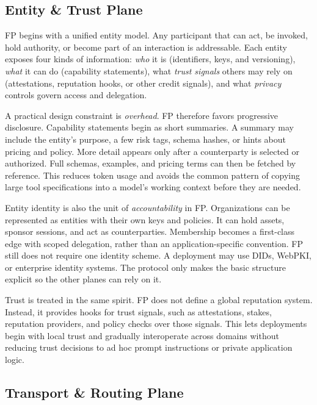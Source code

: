 \documentclass{foundationpaper}
\begin{document}
\subsection{Entity \& Trust Plane}
\label{subsec:entity}

FP begins with a unified entity model. Any participant that can act, be invoked, hold authority, or become part of an interaction is addressable. Each entity exposes four kinds of information: \emph{who} it is (identifiers, keys, and versioning), \emph{what} it can do (capability statements), what \emph{trust signals} others may rely on (attestations, reputation hooks, or other credit signals), and what \emph{privacy} controls govern access and delegation.

A practical design constraint is \emph{overhead}. FP therefore favors progressive disclosure. Capability statements begin as short summaries. A summary may include the entity's purpose, a few risk tags, schema hashes, or hints about pricing and policy. More detail appears only after a counterparty is selected or authorized. Full schemas, examples, and pricing terms can then be fetched by reference. This reduces token usage and avoids the common pattern of copying large tool specifications into a model's working context before they are needed.

Entity identity is also the unit of \emph{accountability} in FP. Organizations can be represented as entities with their own keys and policies. It can hold assets, sponsor sessions, and act as counterparties. Membership becomes a first-class edge with scoped delegation, rather than an application-specific convention. FP still does not require one identity scheme. A deployment may use DIDs, WebPKI, or enterprise identity systems. The protocol only makes the basic structure explicit so the other planes can rely on it.

Trust is treated in the same spirit. FP does not define a global reputation system. Instead, it provides hooks for trust signals, such as attestations, stakes, reputation providers, and policy checks over those signals. This lets deployments begin with local trust and gradually interoperate across domains without reducing trust decisions to ad hoc prompt instructions or private application logic.


\subsection{Transport \& Routing Plane}
\label{subsec:transport}
\end{document}
